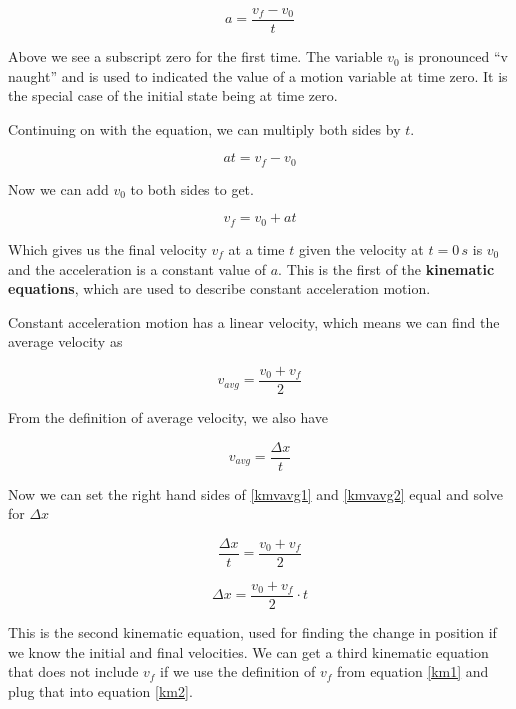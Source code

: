 \documentclass[12pt]{book}
\begin{document}
\begin{equation}
a = \frac{v_f - v_0}{t}
\end{equation}

Above we see a subscript zero for the first time. The variable $v_0$ is pronounced ``v naught'' and is used to indicated the value of a motion variable at time zero. It is the special case of the initial state being at time zero.

Continuing on with the equation, we can multiply both sides by $t$.

\begin{equation}
at = v_f - v_0
\end{equation}

Now we can add $v_0$ to both sides to get.

\begin{equation}
v_f = v_0 + at
\label{km1}
\end{equation}

Which gives us the final velocity $v_f$ at a time $t$ given the velocity at $t = 0 \, s$ is $v_0$ and the acceleration is a constant value of $a$. This is the first of the \textbf{kinematic equations}, which are used to describe constant acceleration motion.

Constant acceleration motion has a linear velocity, which means we can find the average velocity as 

\begin{equation}
v_{avg} = \frac{v_0 + v_f}{2}
\label{kmvavg1}
\end{equation}

From the definition of average velocity, we also have 

\begin{equation}
v_{avg} = \frac{\Delta x}{t}
\label{kmvavg2}
\end{equation}


Now we can set the right hand sides of \ref{kmvavg1} and \ref{kmvavg2} equal and solve for $\Delta x$

\begin{equation}
\frac{\Delta x}{t} = \frac{v_0 + v_f}{2}
\end{equation}

\begin{equation}
\Delta x = \frac{v_0 + v_f}{2} \cdot t
\label{km2}
\end{equation}

This is the second kinematic equation, used for finding the change in position if we know the initial and final velocities. We can get a third kinematic equation that does not include $v_f$ if we use the definition of $v_f$ from equation \ref{km1} and plug that into equation \ref{km2}.
\end{document}
